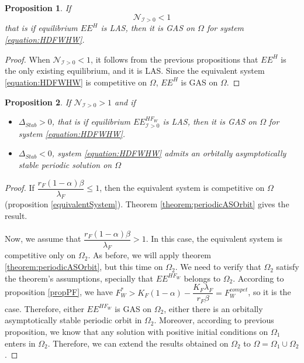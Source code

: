 \documentclass{article}
\newcommand{\lfw}{\lambda_{F}}
\newcommand{\lfw}{\lambda_{F}}
\newcommand{\cI}{\mathcal{I}}
\newtheorem{prop}{Proposition}
\begin{document}
\begin{prop}
If $$\mathcal{N}_{\cI > 0} < 1$$
that is if equilibrium $EE^{H}$ is LAS, then it is GAS on $\Omega$ for system \eqref{equation:HDFWHW}.
\end{prop}

\begin{proof}
When $\mathcal{N}_{\cI > 0} < 1$, it follows from the previous propositions that $EE^{H}$ is the only existing equilibrium, and it is LAS. Since the equivalent system \eqref{equation:HDFWHW} is competitive on $\Omega$, $EE^{H}$ is GAS on $\Omega$.
\end{proof}


\begin{prop}
If $\mathcal{N}_{\cI > 0} > 1$ and if 

\begin{itemize}
\item $\Delta_{Stab} > 0$, that is if equilibrium $EE^{HF_W}_{\cI >0}$ is LAS, then it is GAS on $\Omega$ for system \eqref{equation:HDFWHW}.
\item $\Delta_{Stab} < 0$, system \eqref{equation:HDFWHW} admits an orbitally asymptotically stable periodic solution on $\Omega$
\end{itemize}
\end{prop}

\begin{proof}
If $\dfrac{r_F(1-\alpha) \beta}{\lfw} \leq 1$, then the equivalent system is competitive on $\Omega$ (proposition \ref{equivalentSystem}). Theorem \eqref{theorem:periodicASOrbit} gives the result.

Now, we assume that $\dfrac{r_F(1-\alpha) \beta}{\lfw} > 1$. In this case, the equivalent system is competitive only on $\Omega_2$. As before, we will apply theorem \ref{theorem:periodicASOrbit}, but this time on $\Omega_2$. We need to verify that $\Omega_2$ satisfy the theorem's assumptions, specially that $EE^{HF_W}$ belongs to $\Omega_2$. According to proposition \ref{propPF}, we have $F_W^* > K_F(1-\alpha) - \dfrac{K_F \lfw}{r_F \beta} =  F_W^{compet}$, so it is the case. Therefore, either $EE^{HF_W}$ is GAS on $\Omega_2$, either there is an orbitally asymptotically stable periodic orbit in $\Omega_2$. Moreover, according to previous proposition, we know that any solution with positive initial conditions on $\Omega_1$ enters in $\Omega_2$. Therefore, we can extend the results obtained on $\Omega_2$ to $\Omega = \Omega_1 \cup \Omega_2$.

\end{proof}
\end{document}
